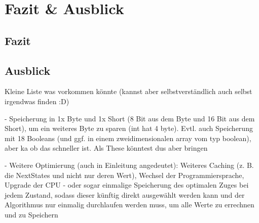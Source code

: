 \chapter{Fazit \& Ausblick}

\section{Fazit}

\section{Ausblick}
Kleine Liste was vorkommen könnte (kannst aber selbstverständlich auch selbst irgendwas finden :D) 

- Speicherung in 1x Byte und 1x Short (8 Bit aus dem Byte und 16 Bit aus dem Short), um ein weiteres Byte zu sparen (int hat 4 byte). Evtl. auch
Speicherung mit 18 Booleans (und ggf. in einem zweidimensionalen array vom typ boolean), aber ka ob das schneller ist. Als These könntest dus aber bringen

- Weitere Optimierung (auch in Einleitung angedeutet): Weiteres Caching (z. B. die NextStates und nicht nur deren Wert), Wechsel der Programmiersprache, Upgrade der CPU - 
oder sogar einmalige Speicherung des optimalen Zuges bei jedem Zustand, sodass dieser künftig direkt ausgewählt werden kann und der Algorithmus nur einmalig
durchlaufen werden muss, um alle Werte zu errechnen und zu Speichern